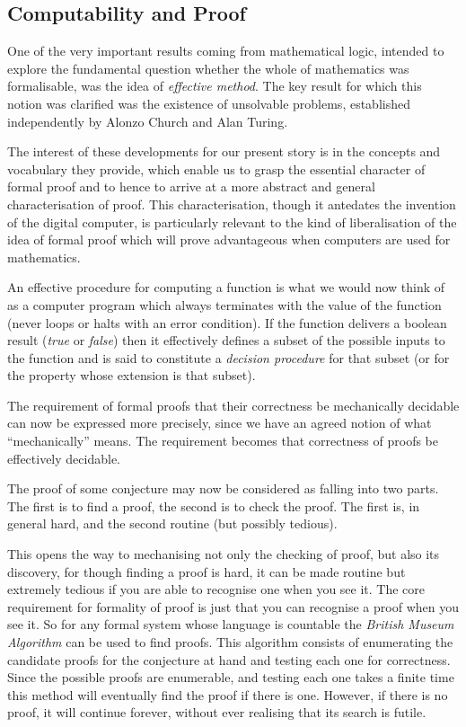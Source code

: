 \subsection{Computability and Proof}

One of the very important results coming from mathematical logic, intended to explore the fundamental question whether the whole of mathematics was formalisable, was the idea of {\it effective method}.
The key result for which this notion was clarified was the existence of unsolvable problems, established independently by Alonzo Church and Alan Turing.

The interest of these developments for our present story is in the concepts and vocabulary they provide, which enable us to grasp the essential character of formal proof and to hence to arrive at a more abstract and general characterisation of proof.
This characterisation, though it antedates the invention of the digital computer, is particularly relevant to the kind of liberalisation of the idea of formal proof which will prove advantageous when computers are used for mathematics.

An effective procedure for computing a function is what we would now think of as a computer program which always terminates with the value of the function (never loops or halts with an error condition).
If the function delivers a boolean result ({\it true} or {\it false}) then it effectively defines a subset of the possible inputs to the function and is said to constitute a {\it decision procedure} for that subset (or for the property whose extension is that subset).

The requirement of formal proofs that their correctness be mechanically decidable can now be expressed more precisely, since we have an agreed notion of what ``mechanically'' means.
The requirement becomes that correctness of proofs be effectively decidable.

The proof of some conjecture may now be considered as falling into two parts.
The first is to find a proof, the second is to check the proof.
The first is, in general hard, and the second routine (but possibly tedious).

This opens the way to mechanising not only the checking of proof, but also its discovery, for though finding a proof is hard, it can be made routine but extremely tedious if you are able to recognise one when you see it.
The core requirement for formality of proof is just that you can recognise a proof when you see it.
So for any formal system whose language is countable the {\it British Museum Algorithm} can be used to find proofs.
This algorithm consists of enumerating the candidate proofs for the conjecture at hand and testing each one for correctness.
Since the possible proofs are enumerable, and testing each one takes a finite time this method will eventually find the proof if there is one.
However, if there is no proof, it will continue forever, without ever realising that its search is futile.

